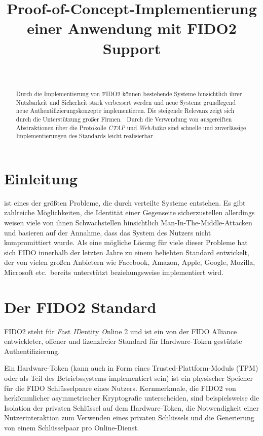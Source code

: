 \documentclass[journal]{IEEEtran}
\title{Proof-of-Concept-Implementierung einer Anwendung mit FIDO2 Support}
\author{
	\IEEEauthorblockN{Mara Schulke \textit{(Matrikel-Nr. 20215853)}}\\
	\IEEEauthorblockA{
		Technische Hochschule Brandenburg \\
		B.Sc. IT Sicherheit \\
		Hardware Sicherheit
	}
}
\begin{document}

\maketitle

\begin{abstract}
	Durch die Implementierung von FIDO2 können bestehende Systeme hinsichtlich
	ihrer Nutzbarkeit und Sicherheit stark verbessert werden und neue Systeme
	grundlegend neue Authentifizierungskonzepte implementieren. Die steigende
	Relevanz zeigt sich durch die Unterstützung großer
	Firmen.~\cite{fidomembers} Durch die Verwendung von ausgereiften
	Abstraktionen über die Protokolle \textit{CTAP} und \textit{WebAuthn} sind
	schnelle und zuverlässige Implementierungen des Standards leicht
	realisierbar.
\end{abstract}

\section{Einleitung}
 ist eines der größten
Probleme, die durch verteilte Systeme entstehen. Es gibt zahlreiche
Möglichkeiten, die Identität einer Gegenseite sicherzustellen allerdings weisen
viele von ihnen Schwachstellen hinsichtlich Man-In-The-Middle-Attacken und
basieren auf der Annahme, dass das System des Nutzers nicht kompromittiert 
wurde. Als eine mögliche Lösung für viele dieser Probleme hat sich FIDO
innerhalb der letzten Jahre zu einem beliebten Standard entwickelt, der von
vielen großen Anbietern wie Facebook, Amazon, Apple, Google, Mozilla,
Microsoft etc.\ bereits unterstützt beziehungsweise implementiert
wird.~\cite{fidomembers}

\section{Der FIDO2 Standard}

FIDO2 steht für \textit{F}ast \textit{ID}entity \textit{O}nline 2 und ist ein
von der FIDO Alliance entwickleter, offener und lizenzfreier Standard für
Hardware-Token gestützte Authentifizierung.

Ein Hardware-Token (kann auch in Form eines Trusted-Plattform-Moduls (TPM) oder
als Teil des Betriebssystems implementiert sein) ist ein physischer Speicher
für die FIDO Schlüsselpaare eines Nutzers. Kernmerkmale, die FIDO2 von
herkömmlicher asymmetrischer Kryptografie unterscheiden, sind beispielsweise
die Isolation der privaten Schlüssel auf dem Hardware-Token, die Notwendigkeit
einer Nutzerinteraktion zum Verwenden eines privaten Schlüssels und die
Generierung von einem Schlüsselpaar pro Online-Dienst.~\cite{ctapspec}
\end{document}

